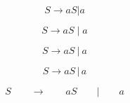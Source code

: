 \documentclass{article}
\begin{document}
$$
S \to aS | a
$$

$$
S \to aS \; | \; a
$$

$$
S \to aS \: | \: a
$$

$$
S \to aS \, | \, a
$$

$$
S \qquad \to \qquad aS \qquad | \qquad a
$$
\end{document}
